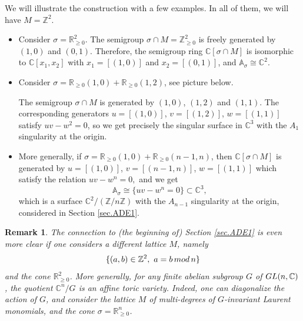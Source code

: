 \documentclass[11pt]{article}
\numberwithin{equation}{section}
\numberwithin{footnote}{section}
\newtheorem{rem}[thm]{Remark}
\newcommand{\blue}{\color{blue}}
\newcommand{\R}{{\mathbb R}}
\newcommand{\Z}{{\mathbb Z}}
\newcommand{\C}{{\mathbb C}}
\newcommand{\A}{\mathbb A}
\begin{document}
\smallskip{\blue \hrule}
We will illustrate the construction with a few examples. In all of them, we will have $M=\Z^2$.
\begin{itemize}
\item Consider $\sigma =\R_{\geq 0}^2$. The semigroup $\sigma\cap M= \Z_{\geq 0}^2$ is freely generated by
$(1,0)$ and $(0,1)$. Therefore, the semigroup ring $\C[\sigma\cap M]$ is isomorphic to $\C[x_1,x_2]$ with $x_1=[(1,0)]$ and 
$x_2=[(0,1)]$, and $\A_\sigma \cong \C^2$.

\item Consider $\sigma = \R_{\geq 0}(1,0) + \R_{\geq 0}(1,2)$, see picture below.


The semigroup $\sigma\cap M$ is generated by $(1,0)$, $(1,2)$ and $(1,1)$. The corresponding generators 
$u=[(1,0)]$, $v=[(1,2)]$, $w=[(1,1)]$ satisfy $uv- w^2=0$, so we get precisely the singular surface in $\C^3$ with the $A_1$ singularity at the origin.

\item More generally, if $\sigma= \R_{\geq 0}(1,0) + \R_{\geq 0}(n-1,n)$, then $\C[\sigma\cap M]$ is generated by 
$u=[(1,0)]$, $v=[(n-1,n)]$, $w=[(1,1)]$ which satisfy the relation
$
uv - w^{n} = 0,
$
and we get 
$$
\A_\sigma \cong \{uv-w^n=0\}\subset \C^3,
$$
which is a surface $\C^2/(\Z/n\Z)$ with the $A_{n-1}$ singularity at the origin, considered in Section \ref{sec.ADE1}. 
\end{itemize}

\smallskip
\begin{rem}
The connection to (the beginning of) Section \ref{sec.ADE1} is even more clear if one considers a different lattice $M$, namely
$$
\{(a,b)\in \Z^2,~a=b\,{\rm mod}\,n\}
$$
and the cone $\R_{\geq 0}^2$. More generally, for any finite abelian subgroup $G$ of ${\rm GL}(n,\C)$, the quotient 
$\C^n/G$ is an affine toric variety. Indeed, one can diagonalize the action of $G$, and consider the lattice $M$ of multi-degrees of $G$-invariant Laurent monomials, and the cone $\sigma =\R_{\geq 0}^n$.
\end{rem}
\end{document}
